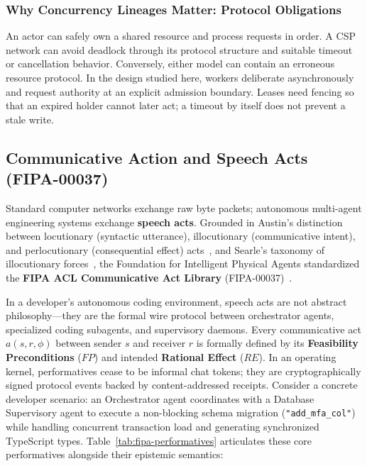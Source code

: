 \documentclass[11pt,a4paper]{article}
\begin{document}
\subsubsection{Why Concurrency Lineages Matter: Protocol Obligations}
\label{sec:why-concurrency-matters}

An actor can safely own a shared resource and process requests in order. A CSP network can avoid deadlock through its protocol structure and suitable timeout or cancellation behavior. Conversely, either model can contain an erroneous resource protocol. In the design studied here, workers deliberate asynchronously and request authority at an explicit admission boundary. Leases need fencing so that an expired holder cannot later act; a timeout by itself does not prevent a stale write.

\subsection{Communicative Action and Speech Acts (FIPA-00037)}

Standard computer networks exchange raw byte packets; autonomous multi-agent engineering systems exchange \textbf{speech acts}. Grounded in Austin's distinction between locutionary (syntactic utterance), illocutionary (communicative intent), and perlocutionary (consequential effect) acts~, and Searle's taxonomy of illocutionary forces~, the Foundation for Intelligent Physical Agents standardized the \textbf{FIPA ACL Communicative Act Library} (FIPA-00037)~.

In a developer's autonomous coding environment, speech acts are not abstract philosophy---they are the formal wire protocol between orchestrator agents, specialized coding subagents, and supervisory daemons. Every communicative act $a(s, r, \phi)$ between sender $s$ and receiver $r$ is formally defined by its \textbf{Feasibility Preconditions} ($FP$) and intended \textbf{Rational Effect} ($RE$). In an operating kernel, performatives cease to be informal chat tokens; they are cryptographically signed protocol events backed by content-addressed receipts. Consider a concrete developer scenario: an Orchestrator agent coordinates with a Database Supervisory agent to execute a non-blocking schema migration (\texttt{"add\_mfa\_col"}) while handling concurrent transaction load and generating synchronized TypeScript types. Table~\ref{tab:fipa-performatives} articulates these core performatives alongside their epistemic semantics:
\end{document}
